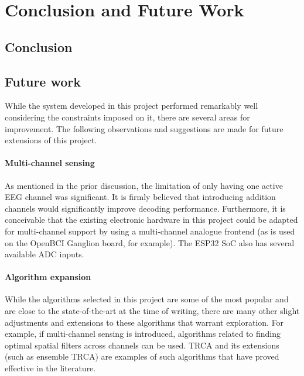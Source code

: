 \chapter{Conclusion and Future Work}
\label{chapter:conclusion}

\section{Conclusion}

\section{Future work}
While the system developed in this project performed remarkably well considering the constraints imposed on it, there are several areas for improvement. The following observations and suggestions are made for future extensions of this project. 

\subsubsection{Multi-channel sensing}
As mentioned in the prior discussion, the limitation of only having one active EEG channel was significant. It is firmly believed that introducing addition channels would significantly improve decoding performance. Furthermore, it is conceivable that the existing electronic hardware in this project could be adapted for multi-channel support by using a multi-channel analogue frontend (as is used on the OpenBCI Ganglion board, for example). The ESP32 SoC also has several available ADC inputs.

\subsubsection{Algorithm expansion}
While the algorithms selected in this project are some of the most popular and are close to the state-of-the-art at the time of writing, there are many other slight adjustments and extensions to these algorithms that warrant exploration. For example, if multi-channel sensing is introduced, algorithms related to finding optimal spatial filters across channels can be used. TRCA and its extensions (such as ensemble TRCA) are examples of such algorithms that have proved effective in the literature. 

